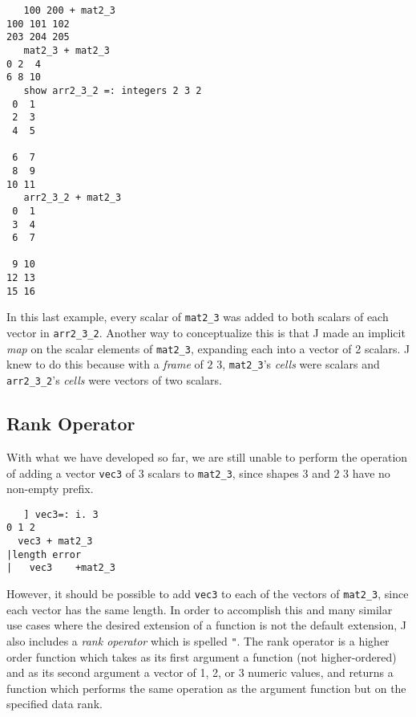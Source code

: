 \begin{singlespacing}
\begin{small}
\begin{verbatim}
   100 200 + mat2_3
100 101 102
203 204 205
   mat2_3 + mat2_3
0 2  4
6 8 10
   show arr2_3_2 =: integers 2 3 2
 0  1
 2  3
 4  5

 6  7
 8  9
10 11
   arr2_3_2 + mat2_3
 0  1
 3  4
 6  7

 9 10
12 13
15 16
\end{verbatim}
\end{small}
\end{singlespacing}

In this last example, every scalar of \texttt{mat2\_3} was added to both scalars of each vector in \texttt{arr2\_3\_2}. 
Another way to conceptualize this is that J made an implicit \textit{map} on the scalar elements of \texttt{mat2\_3}, 
expanding each into a vector of 2 scalars.
J knew to do this because with a \textit{frame} of $2$ $3$, \texttt{mat2\_3}'s \textit{cells} were scalars and 
\texttt{arr2\_3\_2}'s \textit{cells} were vectors of two scalars.

\subsection{Rank Operator}
With what we have developed so far, we are still unable to perform the operation of 
adding a vector \texttt{vec3} of 3 scalars to \texttt{mat2\_3}, since shapes $3$ and $2$ $3$ have no non-empty prefix.

\begin{singlespacing}
\begin{small}
\begin{verbatim}
   ] vec3=: i. 3
0 1 2
  vec3 + mat2_3
|length error
|   vec3    +mat2_3
\end{verbatim}
\end{small}
\end{singlespacing}

However, it should be possible to add \texttt{vec3} to each of the vectors of \texttt{mat2\_3}, since each vector has the same length.
In order to accomplish this and many similar use cases where the desired extension of a function is not the default extension, 
J also includes a \textit{rank operator} which is spelled \texttt{"}.
The rank operator is a higher order function which takes as its first argument a function (not higher-ordered) %
and as its second argument a vector of 1, 2, or 3 numeric values, 
and returns a function which performs the same operation as the argument function but on the specified data rank.\cite{rankanduni}

